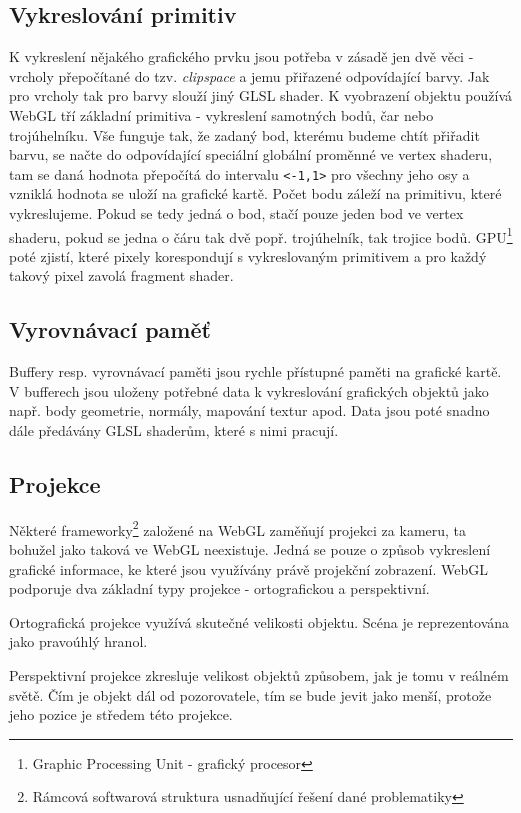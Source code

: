 \subsection{Vykreslování primitiv}
K vykreslení nějakého grafického prvku jsou potřeba v zásadě jen dvě věci - vrcholy přepočítané do tzv. \textit{clipspace} a jemu přiřazené odpovídající barvy. Jak pro vrcholy tak pro barvy slouží jiný GLSL shader. K vyobrazení objektu používá WebGL tří základní primitiva - vykreslení samotných bodů, čar nebo trojúhelníku. Vše funguje tak, že zadaný bod, kterému budeme chtít přiřadit barvu, se načte do odpovídající speciální globální proměnné ve vertex shaderu, tam se daná hodnota přepočítá do intervalu \texttt{<-1,1>} pro všechny jeho osy a vzniklá hodnota se uloží na grafické kartě. Počet bodu záleží na primitivu, které vykreslujeme. Pokud se tedy jedná o bod, stačí pouze jeden bod ve vertex shaderu, pokud se jedna o čáru tak dvě popř. trojúhelník, tak trojice bodů. GPU\footnote{Graphic Processing Unit - grafický procesor} poté zjistí, které pixely korespondují s vykreslovaným primitivem a pro každý takový pixel zavolá fragment shader. 


\subsection{Vyrovnávací paměť}
Buffery resp. vyrovnávací paměti jsou rychle přístupné paměti na grafické kartě. V bufferech jsou  uloženy potřebné data k vykreslování grafických objektů jako např. body geometrie, normály, mapování textur apod. Data jsou poté snadno dále předávány GLSL shaderům, které s nimi pracují.

\newpage

\subsection{Projekce}
Některé frameworky\footnote{Rámcová softwarová struktura usnadňující řešení dané problematiky} založené na WebGL zaměňují projekci za kameru, ta bohužel jako taková ve WebGL neexistuje. Jedná se pouze o způsob vykreslení grafické informace, ke které jsou využívány právě projekční zobrazení. WebGL podporuje dva základní typy projekce - ortografickou a perspektivní. 

Ortografická projekce využívá skutečné velikosti objektu. Scéna je reprezentována jako pravoúhlý hranol.

Perspektivní projekce zkresluje velikost objektů způsobem, jak je tomu v reálném světě. Čím je objekt dál od pozorovatele, tím se bude jevit jako menší, protože jeho pozice je středem této projekce. 
  
